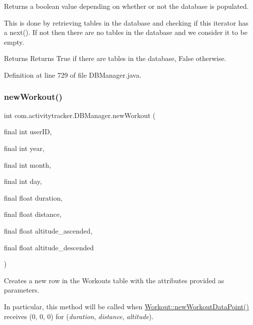 Returns a boolean value depending on whether or not the database is populated.

This is done by retrieving tables in the database and checking if this iterator has a next(). If not then there are no tables in the database and we consider it to be empty.

\begin{DoxyReturn}{Returns}
Returns True if there are tables in the database, False otherwise. 
\end{DoxyReturn}


Definition at line 729 of file D\+B\+Manager.\+java.

\mbox{\label{classcom_1_1activitytracker_1_1_d_b_manager_a54aafd30a4e9f62cbfd0d3c61a887405}} 
\subsubsection{\texorpdfstring{new\+Workout()}{newWorkout()}}
{\footnotesize\ttfamily int com.\+activitytracker.\+D\+B\+Manager.\+new\+Workout (\begin{DoxyParamCaption}\item[{final int}]{user\+ID,  }\item[{final int}]{year,  }\item[{final int}]{month,  }\item[{final int}]{day,  }\item[{final float}]{duration,  }\item[{final float}]{distance,  }\item[{final float}]{altitude\+\_\+ascended,  }\item[{final float}]{altitude\+\_\+descended }\end{DoxyParamCaption})}

Creates a new row in the Workouts table with the attributes provided as parameters.

In particular, this method will be called when \mbox{\hyperlink{classcom_1_1activitytracker_1_1_workout_aa595f618a20c8e98bb96c221c5158e9a}{Workout\+::new\+Workout\+Data\+Point()}} receives (0, 0, 0) for ({\itshape duration}, {\itshape distance}, {\itshape altitude}).


